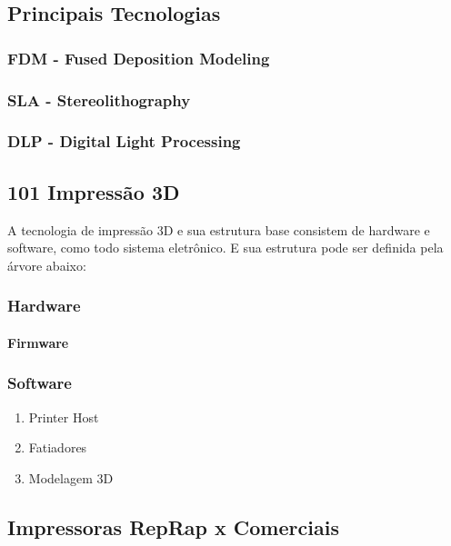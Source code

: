 \subsection{Principais Tecnologias}
\subsubsection{FDM - Fused Deposition Modeling}
\subsubsection{SLA - Stereolithography}
\subsubsection{DLP - Digital Light Processing}

\subsection{101 Impressão 3D}
A tecnologia de impressão 3D e sua estrutura base consistem de hardware e software,
como todo sistema eletrônico. E sua estrutura pode ser definida pela árvore abaixo:
\newline



\subsubsection{Hardware}
\paragraph{Firmware}

\subsubsection{Software}
\begin{enumerate}
  \item Printer Host
  \item Fatiadores
  \item Modelagem 3D
\end{enumerate}

\subsection{Impressoras RepRap x Comerciais}
